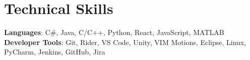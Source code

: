 \section{Technical Skills}
 \begin{itemize}[leftmargin=0.15in, label={}]
    \small{\item{
     \textbf{Languages}{: C\#, Java, C/C++, Python, React, JavaScript, MATLAB} \\
     \textbf{Developer Tools}{: Git, Rider, VS Code, Unity, VIM Motions, Eclipse, Linux, PyCharm, Jenkins, GitHub, Jira} \\
    }}
 \end{itemize}

